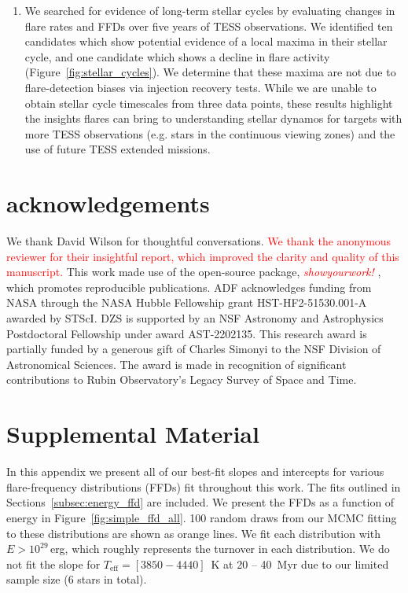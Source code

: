 \documentclass[twocolumn, linenumbers]{aastex631}
\begin{document}
\begin{enumerate}
  \item We searched for evidence of long-term stellar cycles by evaluating changes in flare rates and FFDs  over five years of TESS observations. We identified ten candidates which show potential evidence of a local maxima in their stellar cycle, and one candidate which shows a decline in flare activity (Figure~\ref{fig:stellar_cycles}). We determine that these maxima are not due to flare-detection biases via injection recovery tests. While we are unable to obtain stellar cycle timescales from three data points, these results highlight the insights flares can bring to understanding stellar dynamos for targets with more TESS observations (e.g. stars in the continuous viewing zones) and the use of future TESS extended missions.

\end{enumerate}


\vspace{3mm}



\section{acknowledgements}

We thank David Wilson for thoughtful conversations. \textcolor{red}{We thank the anonymous reviewer for their insightful report,
which improved the clarity and quality of this manuscript.} This work made use of the open-source package,
\textcolor{red}{\textit{showyourwork!}} \citep{luger2021}, which promotes reproducible publications. ADF acknowledges funding from
NASA through the NASA Hubble Fellowship grant HST-HF2-51530.001-A awarded by STScI. DZS is supported by an NSF Astronomy and Astrophysics
Postdoctoral Fellowship under award AST-2202135. This research award is partially funded by a generous gift of Charles Simonyi to the NSF
Division of Astronomical Sciences. The award is made in recognition of significant contributions to Rubin Observatory’s Legacy Survey of Space and Time.



\appendix
\restartappendixnumbering

\section{Supplemental Material}\label{appendix:supp_ffds}

In this appendix we present all of our best-fit slopes and intercepts for various flare-frequency distributions (FFDs) fit throughout this work. The fits outlined in Sections~\ref{subsec:energy_ffd} are included. We present the FFDs as a function of energy in Figure~\ref{fig:simple_ffd_all}.  100 random draws from our MCMC fitting to these distributions are shown as orange lines. We fit each distribution with $E > 10^{29}$\,erg, which roughly represents the turnover in each distribution. We do not fit the slope for $T_\textrm{eff} = [3850 - 4440]$~K at 20 -- 40~Myr due to our limited sample size (6 stars in total).
\end{document}
